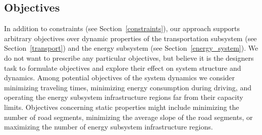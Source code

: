 \subsection{Objectives}
\label{objectives}
In addition to constraints (see Section~\ref{constraints}), our approach supports arbitrary objectives over dynamic properties of the transportation subsystem (see Section~\ref{transport}) and the energy subsystem (see Section~\ref{energy_system}). We do not want to prescribe any particular objectives, but believe it is the designers task to formulate objectives and explore their effect on system structure and dynamics. Among potential objectives of the system dynamics we consider minimizing traveling times, minimizing energy consumption during driving, and operating the energy subsystem infrastructure regions far from their capacity limits. 
Objectives concerning static properties might include minimizing the number of road segments, minimizing the average slope of the road segments, or maximizing the number of energy subsystem infrastructure regions.
